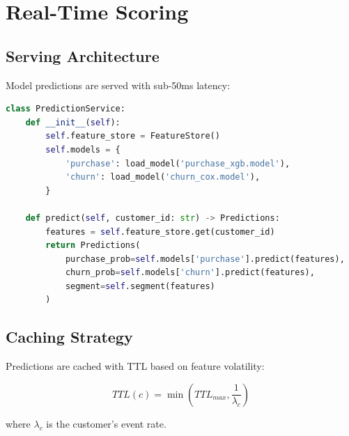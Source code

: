\section{Real-Time Scoring}


\subsection{Serving Architecture}

Model predictions are served with sub-50ms latency:

\begin{lstlisting}[language=Python, caption=Prediction Service]
class PredictionService:
    def __init__(self):
        self.feature_store = FeatureStore()
        self.models = {
            'purchase': load_model('purchase_xgb.model'),
            'churn': load_model('churn_cox.model'),
        }

    def predict(self, customer_id: str) -> Predictions:
        features = self.feature_store.get(customer_id)
        return Predictions(
            purchase_prob=self.models['purchase'].predict(features),
            churn_prob=self.models['churn'].predict(features),
            segment=self.segment(features)
        )
\end{lstlisting}

\subsection{Caching Strategy}

Predictions are cached with TTL based on feature volatility:

\begin{equation}
TTL(c) = \min(TTL_{max}, \frac{1}{\lambda_c})
\end{equation}

where $\lambda_c$ is the customer's event rate.

